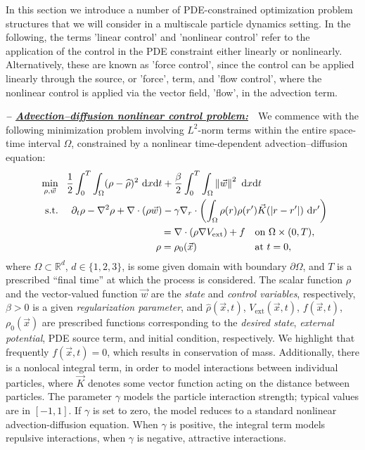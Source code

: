 In this section we introduce a number of PDE-constrained optimization problem structures that we will consider in a multiscale particle dynamics setting. In the following, the terms 'linear control' and 'nonlinear control' refer to the application of the control in the PDE constraint either linearly or nonlinearly. Alternatively, these are known as 'force control', since the control can be applied linearly through the source, or 'force', term, and 'flow control', where the nonlinear control is applied via the vector field, 'flow', in the advection term. 
\vspace{0.75em}

\textbf{\emph{-- \underline{Advection--diffusion nonlinear control problem:}}}~~We commence with the following minimization problem involving $L^2$-norm terms within the entire space-time interval $\Omega$, constrained by a nonlinear time-dependent advection--diffusion equation:
\begin{align}
\ \label{AdvDiff} \min_{\rho,\vec{w}}~~\frac{1}{2}\int_0^T\int_{\Omega}(\rho-\widehat{\rho})^2~{\rm d}x{\rm d}t+{}&\frac{\beta}{2}\int_0^T\int_{\Omega}\left\|\vec{w}\right\|^2~{\rm d}x{\rm d}t \\
\ \nonumber \text{s.t.}\quad~\partial_{t}\rho-\nabla^{2}\rho+\nabla\cdot(\rho\vec{w})-{}&\gamma\nabla_{r}\cdot\left(\int_{\Omega}\rho(r)\rho(r')\vec{K}(|r-r'|)~{\rm d}r'\right)\\
\nonumber
={}&\nabla\cdot(\rho\nabla{}V_{\text{ext}})+f\quad\text{on }\Omega\times(0,T), \\
\ \nonumber \rho={}&\rho_{0}(\vec{x})\quad\hspace{4.9em}\text{at }t=0,
\end{align}
where $\Omega\subset\mathbb{R}^{d}$, $d\in\{1,2,3\}$, is some given domain with boundary $\partial\Omega$, and $T$ is a prescribed ``final time'' at which the process is considered. The scalar function $\rho$ and the vector-valued function $\vec{w}$ are the \emph{state} and \emph{control variables}, respectively, $\beta>0$ is a given \emph{regularization parameter}, and $\widehat{\rho}(\vec{x},t)$, $V_{\text{ext}}(\vec{x},t)$, $f(\vec{x},t)$, $\rho_{0}(\vec{x})$ are prescribed functions corresponding to the \emph{desired state}, \emph{external potential}, PDE source term, and initial condition, respectively. We highlight that frequently $f(\vec{x},t)=0$,
which results in conservation of mass.
Additionally, there is a nonlocal integral term, in order to model interactions between individual particles, where $\vec{K}$ denotes some vector function acting on the distance between particles. The parameter $\gamma$ models the particle interaction strength; typical values are in $[-1,1]$. If $\gamma$ is set to zero, the model reduces to a standard nonlinear advection-diffusion equation. When $\gamma$ is positive, the integral term models repulsive interactions, when $\gamma$ is negative, attractive interactions. 


